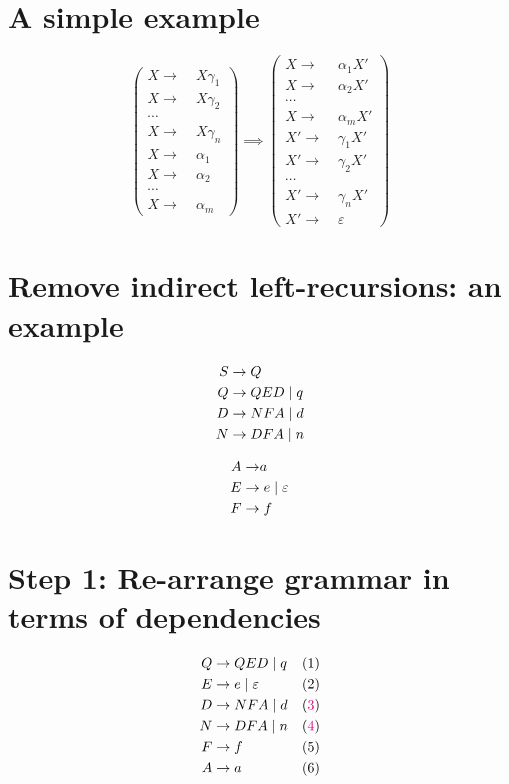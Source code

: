 \documentclass[10pt,a4paper,landscape]{article}
\begin{document}
\begin{multicols*}{3}
\section*{A simple example}
\[
\begin{pmatrix}
  X\to&\; X \gamma_1 \\
  X\to&\; X \gamma_2 \\
  \cdots             \\
  X\to&\; X \gamma_n \\
  X\to&\; \alpha_1   \\
  X\to&\; \alpha_2   \\
  \cdots             \\
  X\to&\; \alpha_m
\end{pmatrix}
\implies
\begin{pmatrix}
  X\to&\; \alpha_1 X' \\
  X\to&\; \alpha_2 X' \\
  \cdots             \\
  X\to&\; \alpha_m X' \\
  X'\to&\;\gamma_1 X' \\
  X'\to&\; \gamma_2 X' \\
  \cdots             \\
  X'\to&\; \gamma_n X' \\
  X'\to&\; \varepsilon
\end{pmatrix}
\]
\section*{Remove indirect left-recursions: an example}
\begin{minipage}{.5\linewidth}
\begin{align}
  S\to &\; Q \\
  Q\to &\; QED \;|\; q \\
  D\to &\; NFA \;|\; d \\
  N\to &\; DFA \;|\; n
\end{align}
\end{minipage}
\begin{minipage}{.5\linewidth}
\begin{align}
  A\to & a \\
  E\to &\; e \;|\; \varepsilon \\
  F\to &\; f
\end{align}
\end{minipage}
\section*{Step 1: Re-arrange grammar in terms of dependencies}
\begin{align*}
  Q\to &\; QED \gor q & (1)\\
  E\to &\; e \gor \varepsilon &(2) \\
  D\to &\; NFA \gor d & (\mr{3})\\
  N\to &\; DFA \gor n & (\mr{4})\\
  F\to &\; f          & (5)\\
  A\to &\; a            & (6)
\end{align*}

\end{multicols*}
\end{document}
